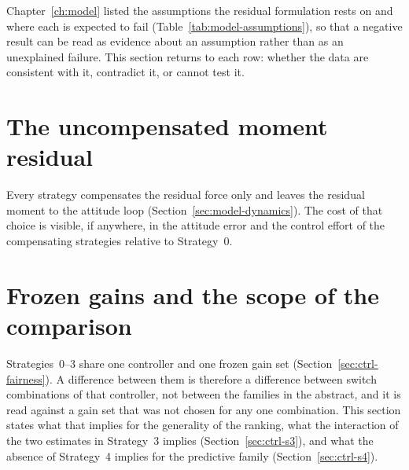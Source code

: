 Chapter~\ref{ch:model} listed the assumptions the residual formulation rests on and where each is
expected to fail (Table~\ref{tab:model-assumptions}), so that a negative result can be read as
evidence about an assumption rather than as an unexplained failure. This section returns to each
row: whether the data are consistent with it, contradict it, or cannot test it.


\section{The uncompensated moment residual}
\label{sec:disc-moment}

Every strategy compensates the residual force only and leaves the residual moment to the attitude
loop (Section~\ref{sec:model-dynamics}). The cost of that choice is visible, if anywhere, in the
attitude error and the control effort of the compensating strategies relative to Strategy~0.


\section{Frozen gains and the scope of the comparison}
\label{sec:disc-frozen}

Strategies~0--3 share one controller and one frozen gain set (Section~\ref{sec:ctrl-fairness}). A
difference between them is therefore a difference between switch combinations of that controller,
not between the families in the abstract, and it is read against a gain set that was not chosen for
any one combination. This section states what that implies for the generality of the ranking, what
the interaction of the two estimates in Strategy~3 implies (Section~\ref{sec:ctrl-s3}), and what the
absence of Strategy~4 implies for the predictive family (Section~\ref{sec:ctrl-s4}).

